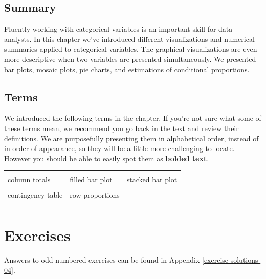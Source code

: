 \documentclass[
  10pt,
  openany]{book}
\begin{document}
\hypertarget{summary-2}{%
\subsection{Summary}\label{summary-2}}

Fluently working with categorical variables is an important skill for data analysts.
In this chapter we've introduced different visualizations and numerical summaries applied to categorical variables.
The graphical visualizations are even more descriptive when two variables are presented simultaneously.
We presented bar plots, mosaic plots, pie charts, and estimations of conditional proportions.

\hypertarget{terms-2}{%
\subsection{Terms}\label{terms-2}}

We introduced the following terms in the chapter.
If you're not sure what some of these terms mean, we recommend you go back in the text and review their definitions.
We are purposefully presenting them in alphabetical order, instead of in order of appearance, so they will be a little more challenging to locate.
However you should be able to easily spot them as \textbf{bolded text}.

\begin{tabu} to 
\toprule
{} &  & \\
column totals & filled bar plot & stacked bar plot\\
 &  & \\
contingency table & row proportions & \\
 &  & \\
\bottomrule
\end{tabu}

\clearpage

\hypertarget{chp4-exercises}{%
\section{Exercises}\label{chp4-exercises}}

Answers to odd numbered exercises can be found in Appendix \ref{exercise-solutions-04}.
\end{document}
